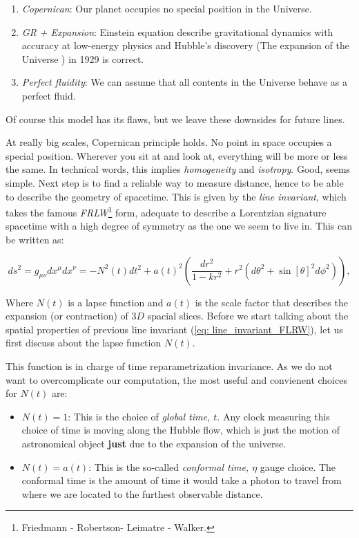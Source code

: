 \documentclass[11pt, a4paper]{article} %
\begin{document}
\begin{enumerate}
	\item \textit{Copernican}: Our planet occupies no special position in the Universe.
	\item \textit{GR + Expansion}: Einstein equation describe gravitational dynamics with accuracy at low-energy physics and Hubble's discovery (The expansion of the Universe \cite{hubble1929relation}) in 1929 is correct.
	\item \textit{Perfect fluidity}: We can assume that all contents in the Universe behave as a perfect fluid.
\end{enumerate}

Of course this model has its flaws, but we leave these downsides for future lines.

At really big scales, Copernican principle holds. No point in space occupies a special position. Wherever you sit at and look at, everything will be more or less the same. In technical words, this implies \textit{homogeneity} and \textit{isotropy}. Good, seems simple. Next step is to find a reliable way to measure distance, hence to be able to describe the geometry of spacetime. This is given by the \textit{line invariant}, which takes the famous \textit{FRLW}\footnote{Friedmann - Robertson- Leimatre - Walker.} form, adequate to describe a Lorentzian signature spacetime with a high degree of symmetry as the one we seem to live in. This can be written as:

\begin{equation}\label{eq: line_invariant_FLRW}
	ds^{2} = g_{\mu \nu} dx^{\mu} dx^{\nu} = - N^{2}(t) dt^{2} + a(t)^2 \left(\frac{dr^{2}}{1- k r^{2}}+ r^{2} \left(d\theta^{2} + \sin[\theta]^{2} d\phi^{2}\right)\right),
\end{equation}

Where $N(t)$ is a lapse function and $a(t)$ is the scale factor that describes the expansion (or contraction) of $3D$ spacial slices. Before we start talking about the spatial properties of previous line invariant (\ref{eq: line_invariant_FLRW}), let us first discuss about the lapse function $N(t)$. 

This function is in charge of time reparametrization invariance. As we do not want to overcomplicate our computation, the most useful and convienent choices for $N(t)$ are:

\begin{itemize}
	\item $N(t) = 1$: This is the choice of \textit{global time, $t$}. Any clock measuring this choice of time is moving along the Hubble flow, which is just the motion of astronomical object \textbf{just} due to the expansion of the universe.
	\item $N(t) = a(t)$: This is the so-called \textit{conformal time, $\eta$} gauge choice. The conformal time is the amount of time it would take a photon to travel from where we are located to the furthest observable distance.
\end{itemize}
\end{document}
